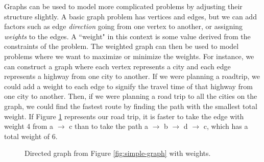 Graphs can be used to model more complicated problems by adjusting their
structure slightly. A basic graph problem has vertices and edges, but we can add
factors such as edge \textit{direction} going from one vertex to another, or
assigning \textit{weights} to the edges. A ``weight" in
this context is some value derived from the constraints of the problem. The weighted graph
can then be used to model problems where we want to maximize or minimize the weights.
For instance, we can construct a graph where each vertex represents a city and
each edge represents a highway from one city to another. If we were planning a
roadtrip, we could add a weight to each edge to signify the travel time of that
highway from one city to another. Then, if we were planning a road trip to all
the cities on the graph, we could find the fastest route by finding the path
with the smallest total weight. If Figure \ref{fig:weighted-graph} represents our road
trip, it is faster to take the edge with weight 4 from a $\rightarrow$ c than to take the
path a $\rightarrow$ b $\rightarrow$ d $\rightarrow$ c, which has a total
weight of 6. 

\begin{figure}[H] \centering
  \caption{Directed graph from
    Figure \ref{fig:simple-graph} with weights.} \label{fig:weighted-graph}
\end{figure}

